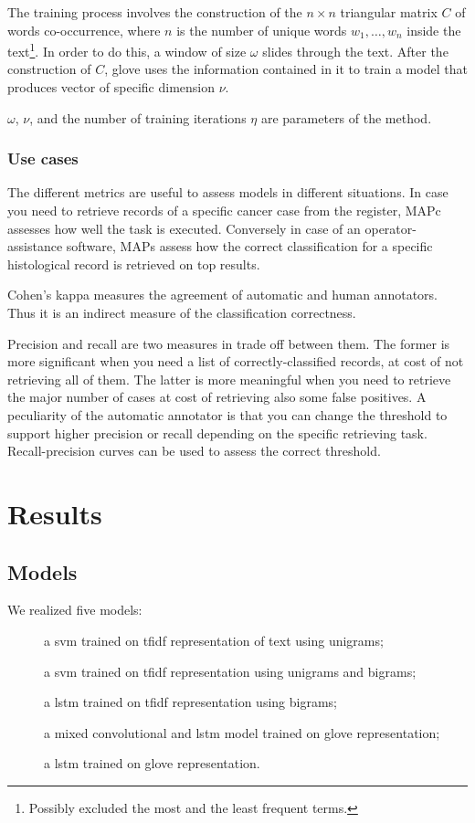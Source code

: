 The training process involves the construction of the
$n\times n$ triangular matrix $C$ of words co-occurrence, where $n$ is
the number of unique words $w_1,\dots,w_n$ inside the text\footnote{Possibly excluded the
  most and the least frequent terms.}. In order to do this, a window of
size $\omega$ slides
through the text. After the construction of $C$, \ac{glove} uses the
information contained in it to train a model that produces vector of
specific dimension $\nu$.

$\omega$, $\nu$, and the number of
training iterations $\eta$ are parameters of the method. 

\subsubsection{Use cases}
The different metrics are useful to assess models in different
situations. In case you need to retrieve records of a specific
cancer case from the register, MAPc assesses how
well the task is executed.
Conversely in case of an operator-assistance software, MAPs
assess how the correct classification
for a specific histological record is retrieved on top results. 

Cohen's kappa measures the agreement of automatic
and human annotators. Thus it is an indirect measure of the
classification correctness.

Precision and recall are two measures in trade off between them. The
former is more significant when you need a list of
correctly-classified records, at cost of not retrieving all of
them. The latter is more
meaningful when you need to retrieve the major number of cases at cost
of retrieving also some false positives. A peculiarity of the
automatic annotator is that you can change the threshold to support
higher precision or recall depending on the specific retrieving
task. Recall-precision
curves can be used to assess the correct threshold.

\section{Results}
\subsection{Models}\label{sec:models}
We realized five models:
\begin{description}
\item[\svm] a \ac{svm} trained on \ac{tfidf} representation of text
  using unigrams;
\item[\svmb] a \ac{svm} trained on \ac{tfidf} representation
  using unigrams and bigrams;
\item[\lstmng] a \ac{lstm} trained on \ac{tfidf} representation using
  bigrams;
\item[\lstmc] a mixed convolutional and \ac{lstm} model trained on
  \ac{glove} representation;
\item[\lstmb] a \ac{lstm} trained on \ac{glove} representation.
\end{description}

